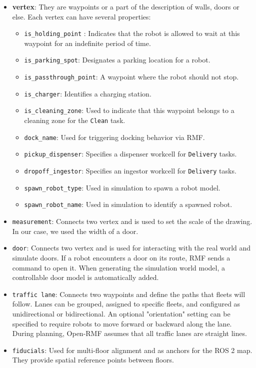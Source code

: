 \begin{itemize}
	\item \textbf{vertex}: They are waypoints or a part of the description of walls, doors or else. Each vertex can have several properties:
	\begin{itemize}
		\item \texttt{is\_holding\_point} : Indicates that the robot is allowed to wait at this waypoint for an indefinite period of time.
		\item \texttt{is\_parking\_spot}: Designates a parking location for a robot.
		\item \texttt{is\_passthrough\_point}: A waypoint where the robot should not stop.
		\item \texttt{is\_charger}: Identifies a charging station.
		\item \texttt{is\_cleaning\_zone}: Used to indicate that this waypoint belongs to a cleaning zone for the \texttt{Clean} task.
		\item \texttt{dock\_name}: Used for triggering docking behavior via RMF.
		\item \texttt{pickup\_dispenser}: Specifies a dispenser workcell for \texttt{Delivery} tasks.
		\item \texttt{dropoff\_ingestor}: Specifies an ingestor workcell for \texttt{Delivery} tasks.
		\item \texttt{spawn\_robot\_type}: Used in simulation to spawn a robot model.
		\item \texttt{spawn\_robot\_name}: Used in simulation to identify a spawned robot.
	\end{itemize}
	\item \texttt{measurement}: Connects two vertex and is used to set the scale of the drawing. In our case, we used the width of a door.
	\item \texttt{door}: Connects two vertex and is used for interacting with the real world and simulate doors. If a robot encounters a door on its route, RMF sends a command to open it. When generating the simulation world model, a controllable door model is automatically added.
	\item \texttt{traffic lane}: Connects two waypoints and define the paths that fleets will follow. Lanes can be grouped, assigned to specific fleets, and configured as unidirectional or bidirectional. An optional "orientation" setting can be specified to require robots to move forward or backward along the lane. During planning, Open-RMF assumes that all traffic lanes are straight lines.
	\item \texttt{fiducials}: Used for multi-floor alignment and as anchors for the ROS 2 map. They provide spatial reference points between floors.

\end{itemize}
